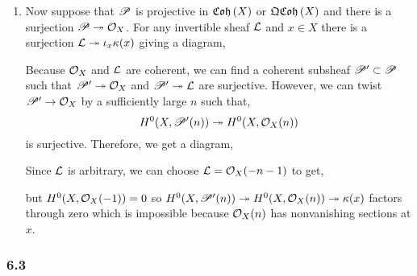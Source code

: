 \documentclass[12pt]{article}
\begin{document}
\begin{enumerate}
\item Now suppose that $\mathscr{P}$ is projective in $\mathfrak{Coh}\left(X\right)$ or $\mathfrak{QCoh}\left(X\right)$ and there is a surjection $\mathscr{P} \twoheadrightarrow \mathcal{O}_{X}$. For any invertible sheaf $\mathcal{L}$ and $x \in X$ there is a surjection $\mathcal{L} \twoheadrightarrow \iota_x \kappa(x)$ giving a diagram,
\begin{center}
\end{center}
Because $\mathcal{O}_{X}$ and $\mathcal{L}$ are coherent, we can find a coherent subsheaf $\mathscr{P}' \subset \mathscr{P}$ such that $\mathscr{P}' \twoheadrightarrow \mathcal{O}_{X}$ and $\mathscr{P}' \twoheadrightarrow \mathcal{L}$ are surjective. However, we can twist $\mathscr{P}' \to \mathcal{O}_{X}$ by a sufficiently large $n$ such that,
\[ H^0(X, \mathscr{P}'(n)) \twoheadrightarrow H^0(X, \mathcal{O}_{X}(n)) \]
is surjective. Therefore, we get a diagram,
\begin{center}
\end{center}
Since $\mathcal{L}$ is arbitrary, we can choose $\mathcal{L} = \mathcal{O}_{X}(-n-1)$ to get,
\begin{center}
\end{center}
but $H^0(X, \mathcal{O}_{X}(-1)) = 0$ so $H^0(X, \mathscr{P}'(n)) \twoheadrightarrow H^0(X, \mathcal{O}_{X}(n)) \twoheadrightarrow \kappa(x)$ factors through zero which is impossible because $\mathcal{O}_{X}(n)$ has nonvanishing sections at $x$.

\end{enumerate}

\subsubsection{6.3}
\end{document}
